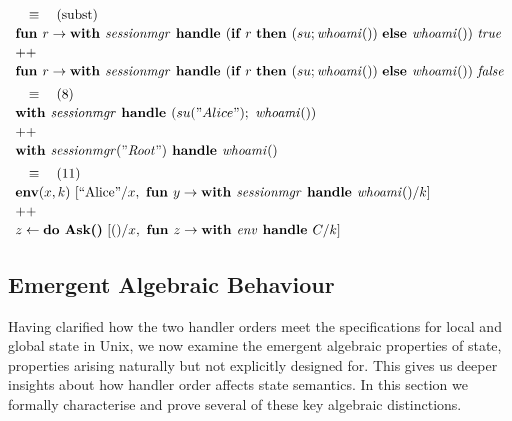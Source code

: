 \documentclass[logo,bsc,singlespacing,parskip]{infthesis}
\begin{document}
\begin{tcolorbox}[examplebox, title=Practical Example: Inheriting environment variables]
\[\begin{array}{l}
\quad\equiv\quad (\text{subst}) \\[2pt]
\textbf{fun } r \rightarrow \textbf{with } \mathit{sessionmgr} \textbf{ handle } (\textbf{if } r \ \textbf{then } (su; \mathit{whoami}()) \ \textbf{else } \mathit{whoami}()) \ \mathit{true} \\[2pt]
\text{++} \\[2pt]
\textbf{fun } r \rightarrow \textbf{with } \mathit{sessionmgr} \textbf{ handle } (\textbf{if } r \ \textbf{then } (su; \mathit{whoami}()) \ \textbf{else } \mathit{whoami}()) \ \mathit{false} \\[5pt]

\quad\equiv\quad (8) \\[2pt]
\textbf{with } \mathit{sessionmgr} \textbf{ handle } (su("Alice");\ \mathit{whoami}()) \\[2pt]
\text{++} \\[2pt]
\textbf{with } \mathit{sessionmgr("Root")} \textbf{ handle } \mathit{whoami}() \\[5pt]

\quad\equiv\quad (11) \\[2pt]
\textbf{env}(x,k)\ [\text{``Alice''}/x,\ \textbf{fun } y \rightarrow \textbf{with } \mathit{sessionmgr} \textbf{ handle } \mathit{whoami}()/k] \\[2pt]
\text{++} \\[2pt]
z \leftarrow \textbf{do Ask()} \ [()/x,\ \textbf{fun } z \rightarrow \textbf{with } \mathit{env} \textbf{ handle } C/k] \\
\end{array}
\]


\end{tcolorbox}







\subsection{Emergent Algebraic Behaviour}
Having clarified how the two handler orders meet the specifications for local and global state in Unix, we now examine the emergent algebraic properties of state, properties arising naturally but not explicitly designed for. This gives us deeper insights about how handler order affects state semantics. In this section we formally characterise and prove several of these key algebraic distinctions. 
\end{document}
